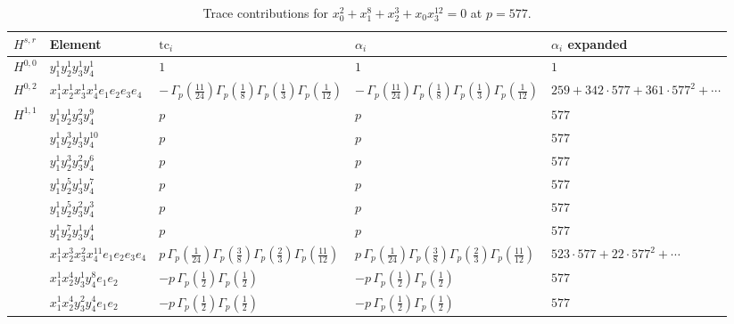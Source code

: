 \documentclass[11pt]{article}
\begin{document}
\begin{table}[ht]
\centering
\caption{Trace contributions for $x_0^{2} + x_1^{8} + x_2^{3} + x_0 x_3^{12} = 0$ at $p=577$.}\label{tab:deformed-61}
\renewcommand{\arraystretch}{1.1}
{\scriptsize
\begin{tabular}{@{}lllll@{}}
\toprule
$H^{s,r}$ & Element & $\mathrm{tc}_i$ & $\alpha_i$ & $\alpha_i$ expanded \\
\midrule
$H^{0,0}$ & $y_{1}^{1} y_{2}^{1} y_{3}^{1} y_{4}^{1}$ & $1$ & $1$ & $1$ \\
\midrule
$H^{0,2}$ & $x_{1}^{1} x_{2}^{1} x_{3}^{1} x_{4}^{1}  e_{1} e_{2} e_{3} e_{4}$ & $- \, \Gamma_p \left( \frac{11}{24} \right) \Gamma_p \left( \frac{1}{8} \right) \Gamma_p \left( \frac{1}{3} \right) \Gamma_p \left( \frac{1}{12} \right)$ & $- \, \Gamma_p \left( \frac{11}{24} \right) \Gamma_p \left( \frac{1}{8} \right) \Gamma_p \left( \frac{1}{3} \right) \Gamma_p \left( \frac{1}{12} \right)$ & $259{+}342{\cdot}577{+}361{\cdot}577^{2}{+}\cdots$ \\
\midrule
$H^{1,1}$ & $y_{1}^{1} y_{2}^{1} y_{3}^{2} y_{4}^{9}$ & $p \,$ & $p \,$ & $577$ \\
 & $y_{1}^{1} y_{2}^{3} y_{3}^{1} y_{4}^{10}$ & $p \,$ & $p \,$ & $577$ \\
 & $y_{1}^{1} y_{2}^{3} y_{3}^{2} y_{4}^{6}$ & $p \,$ & $p \,$ & $577$ \\
 & $y_{1}^{1} y_{2}^{5} y_{3}^{1} y_{4}^{7}$ & $p \,$ & $p \,$ & $577$ \\
 & $y_{1}^{1} y_{2}^{5} y_{3}^{2} y_{4}^{3}$ & $p \,$ & $p \,$ & $577$ \\
 & $y_{1}^{1} y_{2}^{7} y_{3}^{1} y_{4}^{4}$ & $p \,$ & $p \,$ & $577$ \\
 & $x_{1}^{1} x_{2}^{3} x_{3}^{2} x_{4}^{11}  e_{1} e_{2} e_{3} e_{4}$ & $p \, \Gamma_p \left( \frac{1}{24} \right) \Gamma_p \left( \frac{3}{8} \right) \Gamma_p \left( \frac{2}{3} \right) \Gamma_p \left( \frac{11}{12} \right)$ & $p \, \Gamma_p \left( \frac{1}{24} \right) \Gamma_p \left( \frac{3}{8} \right) \Gamma_p \left( \frac{2}{3} \right) \Gamma_p \left( \frac{11}{12} \right)$ & $523{\cdot}577{+}22{\cdot}577^{2}{+}\cdots$ \\
 & $x_{1}^{1} x_{2}^{4} y_{3}^{1} y_{4}^{8} e_{1} e_{2}$ & $- p \, \Gamma_p \left( \frac{1}{2} \right) \Gamma_p \left( \frac{1}{2} \right)$ & $- p \, \Gamma_p \left( \frac{1}{2} \right) \Gamma_p \left( \frac{1}{2} \right)$ & $577$ \\
 & $x_{1}^{1} x_{2}^{4} y_{3}^{2} y_{4}^{4} e_{1} e_{2}$ & $- p \, \Gamma_p \left( \frac{1}{2} \right) \Gamma_p \left( \frac{1}{2} \right)$ & $- p \, \Gamma_p \left( \frac{1}{2} \right) \Gamma_p \left( \frac{1}{2} \right)$ & $577$ \\

\end{tabular}}
\end{table}
\end{document}
